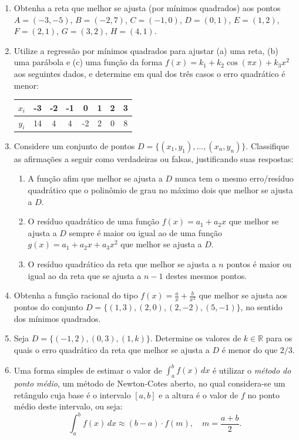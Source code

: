 \documentclass[12pt,a4paper]{article}
\newcommand*\R{\mathbb{R}}
\begin{document}
\begin{enumerate}
\item Obtenha a reta que melhor se ajusta (por mínimos quadrados) aos pontos
$A = (-3, -5)$,
$B = (-2,  7)$,
$C = (-1,  0)$,
$D = ( 0,  1)$,
$E = ( 1,  2)$,
$F = ( 2,  1)$,
$G = ( 3,  2)$,
$H = ( 4,  1)$.
\item Utilize a regressão por mínimos quadrados para ajustar (a) uma reta, (b) uma parábola e (c) uma função da forma $f(x) = k_1 + k_2 \cos(\pi x) + k_3 x^2$ aos seguintes dados, e determine em qual dos três casos o erro quadrático é menor:
\begin{center}
\begin{tabular}{|c|c|c|c|c|c|c|c|}
\hline
   $x_i$ & -3 & -2 & -1 &  0 & 1 & 2 & 3 \\ \hline
$y_i$ & 14 &  4 &  4 & -2 & 2 & 0 & 8 \\ \hline
\end{tabular}
\end{center}

\item Considere um conjunto de pontos $D = \{(x_1,y_1), \ldots, (x_n,y_n)\}$. Classifique as afirmações a seguir como verdadeiras ou falsas, justificando suas respostas:
\begin{enumerate}
\item A função afim que melhor se ajusta a $D$ nunca tem o mesmo erro/resíduo quadrático que o polinômio de grau no máximo dois que melhor se ajusta a $D$.
\item O resíduo quadrático de uma função $f(x) = a_1 + a_2 x$ que melhor se ajusta a $D$ sempre é maior ou igual ao de uma função $g(x) = a_1 + a_2 x + a_3 x^2$ que melhor se ajusta a $D$.
\item O resíduo quadrático da reta que melhor se ajusta a $n$ pontos é maior ou igual ao da reta que se ajusta a $n-1$ destes mesmos pontos.
\end{enumerate}

\item Obtenha a função racional do tipo $f(x) = \frac{a}{x} + \frac{b}{x^2}$ que melhor se ajusta aos pontos do conjunto $D = \{ (1, 3), (2, 0), (2, -2), (5, -1) \}$, no sentido dos mínimos quadrados.

\item Seja $D = \{ (-1,2), (0,3), (1, k) \}$. Determine os valores de $k \in \R$ para os quais o erro quadrático da reta que melhor se ajusta a $D$ é menor do que $2/3$.

\item Uma forma simples de estimar o valor de $\int_a^b f(x)\,dx$ é utilizar o \textit{método do ponto médio}, um método de Newton-Cotes aberto, no qual considera-se um retângulo cuja base é o intervalo $[a,b]$ e a altura é o valor de $f$ no ponto médio deste intervalo, ou seja:
\[
\int_a^b f(x)\,dx \approx (b-a) \cdot f\left(m \right),
\quad
m = \frac{a+b}{2}.
\]


\end{enumerate}
\end{document}
